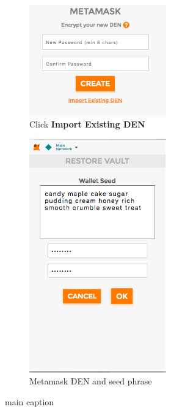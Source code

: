 \begin{figure}[H]
	\centering
	\begin{subfigure}{0.48\textwidth}
		\centering\includegraphics[width=0.65\textwidth]{img/import.png}
		\caption{Click \textbf{Import Existing DEN}}\label{fig:metamask2a}
	\end{subfigure}
	\begin{subfigure}{0.48\textwidth}
		\centering\includegraphics[width=0.65\textwidth]{img/stringPsw.png}
		\caption{Metamask DEN and seed phrase}\label{fig:metamask2b}
	\end{subfigure}
	\caption{main caption}
	\label{fig:metamask2}
\end{figure}
